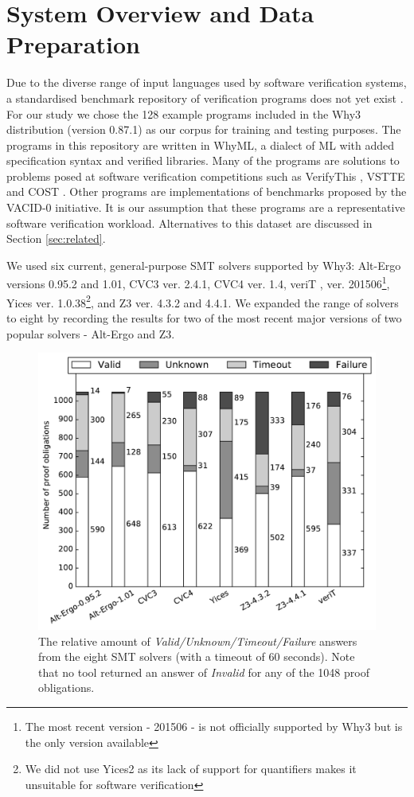 \documentclass[submission,copyright,creativecommons]{eptcs}
\begin{document}
\section{System Overview and Data Preparation}
\label{sec:overview}

Due to the diverse range of input languages used by software verification systems, a standardised benchmark repository of verification programs does not yet exist \cite{Dagstuhl}.
For our study we chose the 128 example programs included in the \textsf{Why3} distribution (version 0.87.1) as our corpus for training and testing purposes. The programs in this repository are written in WhyML, a dialect of ML with added specification syntax and verified libraries. Many of the programs are solutions to problems posed at software verification competitions such as VerifyThis \cite{verifythis}, VSTTE \cite{Klebanov2011} and COST \cite{bormer:hal-00789525}. Other programs are implementations of benchmarks proposed by the VACID-0 \cite{Leino10vacid-0:verification} initiative.   It is our assumption that these programs are a representative software verification workload. Alternatives to this dataset are discussed in Section \ref{sec:related}. 
    
We used six current, general-purpose SMT solvers supported by \textsf{Why3}: Alt-Ergo \cite{AltErgo} versions 0.95.2 and 1.01, CVC3 \cite{CVC3} ver. 2.4.1, CVC4 \cite{CVC4} ver. 1.4, veriT \cite{veriT}, ver. 201506\footnote{The most recent version - 201506 - is not officially supported by \textsf{Why3} but is the only version available}, Yices \cite{Yices} ver. 1.0.38\footnote{We did not use Yices2 as its lack of support for quantifiers makes it unsuitable for software verification}, and Z3 \cite{Z3} ver. 4.3.2 and 4.4.1. We expanded the range of solvers to eight by recording the results for two of the most recent major versions of two popular solvers - Alt-Ergo and Z3.


\begin{figure}
\centering
\includegraphics[width=0.7\linewidth]{barcharts}
\caption{The relative amount of \textit{Valid/Unknown/Timeout/Failure} answers from the eight SMT solvers (with a timeout of 60 seconds). Note that no tool returned an answer of \textit{Invalid} for any of the 1048 proof obligations.}
\label{fig:barcharts}
\end{figure}
    
\end{document}
